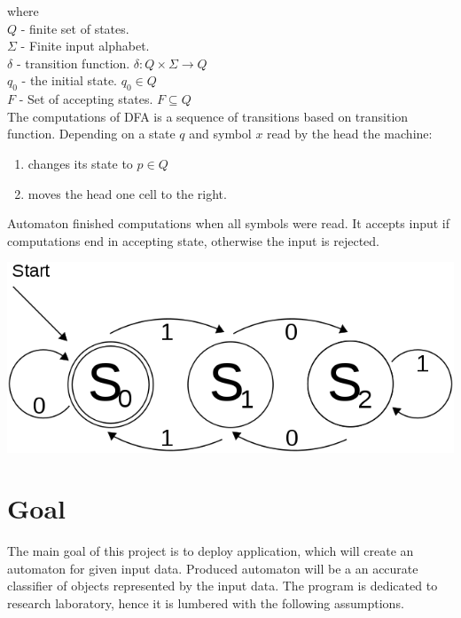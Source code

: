 \documentclass{article}
\begin{document}
\begin{itemize}
where \\
$Q$ - finite set of states. \\
$\Sigma$ - Finite input alphabet. \\
$\delta$ - transition function. $\delta: Q \times \Sigma \rightarrow Q$ \\
$q_0$ - the initial state. $q_0 \in Q$ \\
$F$ - Set of accepting states. $F \subseteq Q$ \\


The computations of DFA is a sequence of transitions based on transition function.
Depending on a state $q$ and symbol $x$ read by the head the machine:
\begin{enumerate}
	\item changes its state to $p \in Q$
	\item moves the head one cell to the right.
\end{enumerate}

Automaton finished computations when all symbols were read. It accepts input if computations end in accepting state, otherwise the input is rejected.



\end{itemize}
\begin{center}
\includegraphics[scale=0.4]{images/automaton.png}
\end{center}



\newpage
\section{Goal}
The main goal of this project is to deploy application, which will create an automaton for given input data. Produced automaton will be a an accurate classifier of objects represented
by the input data. The program is dedicated to research laboratory, hence it is lumbered with the following assumptions.
\end{document}
